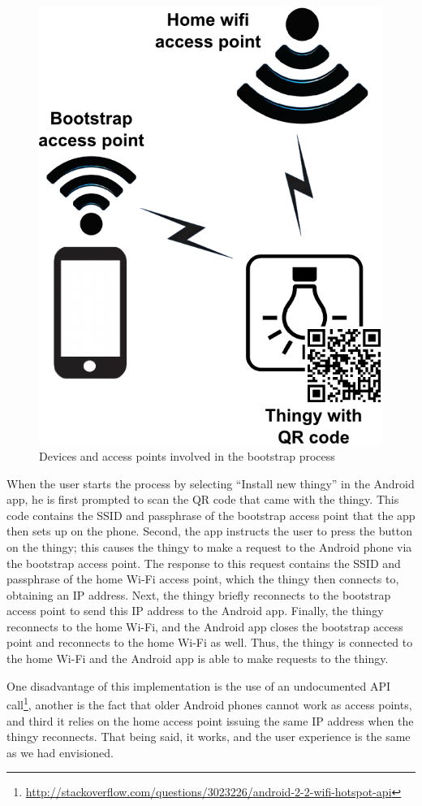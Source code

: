 \documentclass{ubicomp2012}
\begin{document}
\begin{figure}[th]
\begin{center}
\includegraphics[width=0.70\columnwidth]{figures/bootstrap-drawing.png}
\end{center}
\caption{Devices and access points involved in the bootstrap process}
\label{fig:bootstrapDraw}
\end{figure}

When the user starts the process by selecting ``Install new thingy'' in the Android app, he is first prompted to scan the QR code that came with the thingy. This code contains the SSID and passphrase of the bootstrap access point that the app then sets up on the phone. Second, the app instructs the user to press the button on the thingy; this causes the thingy to make a request to the Android phone via the bootstrap access point. The response to this request contains the SSID and passphrase of the home Wi-Fi access point, which the thingy then connects to, obtaining an IP address. Next, the thingy briefly reconnects to the bootstrap access point to send this IP address to the Android app. Finally, the thingy reconnects to the home Wi-Fi, and the Android app closes the bootstrap access point and reconnects to the home Wi-Fi as well. Thus, the thingy is connected to the home Wi-Fi and the Android app is able to make requests to the thingy.

One disadvantage of this implementation is the use of an undocumented API call\footnote{\url{http://stackoverflow.com/questions/3023226/android-2-2-wifi-hotspot-api}}, another is the fact that older Android phones cannot work as access points, and third it relies on the home access point issuing the same IP address when the thingy reconnects. That being said, it works, and the user experience is the same as we had envisioned.
\end{document}

